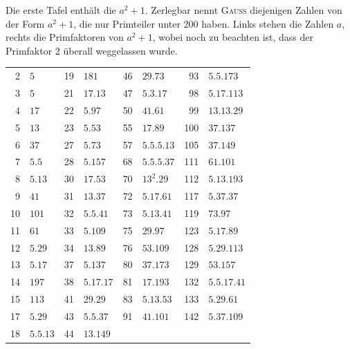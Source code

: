 Die erste Tafel enthält die  $a^2+1$. Zerlegbar nennt \textsc{Gauss}
diejenigen Zahlen von der Form $a^2+1$, die nur Primteiler unter 200 haben.
Links stehen die Zahlen $a$, rechts die Primfaktoren von $a^2+1$, wobei noch
zu beachten ist, dass der Primfaktor 2 überall weggelassen wurde.
\clearpage{}
\setcounter{footnote}{0}
\begin{center}\renewcommand{\arraystretch}{1.13}\setlength{\tabcolsep}{5pt}
\begin{tabular}{r|l@{\qquad}r|l@{\qquad}r|l@{\qquad}r|l}
2 & $5$ & 19 & $181$ & 46 & $29\mathord{.}73$ & 93 & $5\mathord{.}5\mathord{.}173$\\
3 & $5$ & 21 & $17\mathord{.}13$ & 47 & $5\mathord{.}3\mathord{.}17$ & 98 & $5\mathord{.}17\mathord{.}113$\\
4 & $17$ & 22 & $5\mathord{.}97$ & 50 & $41\mathord{.}61$ & 99 & $13\mathord{.}13\mathord{.}29$\\
5 & $13$ & 23 & $5\mathord{.}53$ & 55 & $17\mathord{.}89$ & 100 & $37\mathord{.}137$\\
6 & $37$ & 27 & $5\mathord{.}73$ & 57 & $5\mathord{.}5\mathord{.}5\mathord{.}13$ & 105 & $37\mathord{.}149$\\
7 & $5\mathord{.}5$ & 28 & $5\mathord{.}157$ & 68 & $5\mathord{.}5\mathord{.}5\mathord{.}37$ & 111 & $61\mathord{.}101$\\
8 & $5\mathord{.}13$ & 30 & $17\mathord{.}53$ & 70 & $13^2\mathord{.}29$ & 112 & $5\mathord{.}13\mathord{.}193$\\
9 & $41$ & 31 & $13\mathord{.}37$ & 72 & $5\mathord{.}17\mathord{.}61$ & 117 & $5\mathord{.}37\mathord{.}37$\\
10 & $101$ & 32 & $5\mathord{.}5\mathord{.}41$ & 73 & $5\mathord{.}13\mathord{.}41$ & 119 & $73\mathord{.}97$\\
11 & $61$ & 33 & $5\mathord{.}109$ & 75 & $29\mathord{.}97$ & 123 & $5\mathord{.}17\mathord{.}89$\\
12 & $5\mathord{.}29$ & 34 & $13\mathord{.}89$ & 76 & $53\mathord{.}109$ & 128 & $5\mathord{.}29\mathord{.}113$\\
13 & $5\mathord{.}17$ & 37 & $5\mathord{.}137$ & 80 & $37\mathord{.}173$ & 129 & $53\mathord{.}157$\\
14 & $197$ & 38 & $5\mathord{.}17\mathord{.}17$ & 81 & $17\mathord{.}193$ & 132 & $5\mathord{.}5\mathord{.}17\mathord{.}41$\\
15 & $113$ & 41 & $29\mathord{.}29$ & 83 & $5\mathord{.}13\mathord{.}53$ & 133 & $5\mathord{.}29\mathord{.}61$\\
17 & $5\mathord{.}29$ & 43 & $5\mathord{.}5\mathord{.}37$ & 91 & $41\mathord{.}101$ & 142 & $5\mathord{.}37\mathord{.}109$\\
18 & $5\mathord{.}5\mathord{.}13$ & 44 & $13\mathord{.}149$ & & & &
\end{tabular}\end{center}
